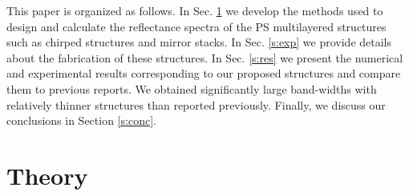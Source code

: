 \documentclass[a4paper,fleqn]{cas-sc}
\begin{document}
This paper is organized as follows. In Sec. \ref{s:theory} we develop the
methods used to design and calculate the reflectance spectra of the PS
multilayered structures such as chirped structures and mirror
stacks. In Sec. \ref{s:exp} we provide details about the
fabrication of these structures. In Sec. \ref{s:res} we present the numerical
and experimental results corresponding to our proposed structures and compare
them to previous reports. We obtained significantly large band-widths
with relatively thinner structures than reported previously.
Finally, we discuss our conclusions in Section \ref{s:conc}.

\section{Theory} \label{s:theory}
\end{document}
